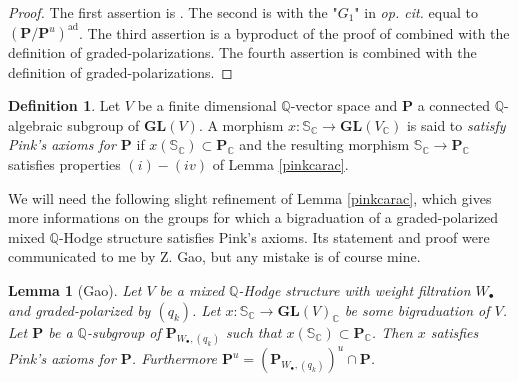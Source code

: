 \documentclass[10pt]{article}
\numberwithin{equation}{subsection}
\theoremstyle{plain}
\newtheorem{lemma}[theorem]{Lemma}
\theoremstyle{definition}
\newtheorem{definition}[theorem]{Definition}
\theoremstyle{remark}
\newcommand{\Q}{\mathbb Q}
\newcommand{\C}{\mathbb C}
\newcommand{\s}{\mathbb S}
\newcommand{\pp}{\mathbf P}
\newcommand{\bul}{\bullet}
\newcommand{\gl}{\mathbf{GL}}
\newcommand{\ad}{\mathrm{ad}}
\newcommand{\ppol}{\pp_{W_\bul, (q_k)}}
\begin{document}
\begin{proof}
The first assertion is \cite[(1.5)]{pinkthese}. The second is \cite[(1.12)]{pinkthese} with the "$G_1$" in \textit{op. cit.} equal to $(\pp/\pp^u)^\ad$. The third assertion is a byproduct of the proof of \cite[(1.5)]{pinkthese} combined with the definition of graded-polarizations. The fourth assertion is \cite[(1.4)(b)]{pinkthese} combined with the definition of graded-polarizations.
\end{proof}
\begin{definition}
Let $V$ be a finite dimensional $\Q$-vector space and $\pp$ a connected $\Q$-algebraic subgroup of $\gl(V)$. A morphism $x : \s_\C \rightarrow \gl(V_\C)$ is said to \textit{satisfy Pink's axioms for $\pp$} if $x(\s_\C) \subset \pp_\C$ and the resulting morphism $\s_\C \rightarrow \pp_\C$ satisfies properties $(i)-(iv)$ of Lemma \ref{pinkcarac}.
\end{definition}
We will need the following slight refinement of Lemma \ref{pinkcarac}, which gives more informations on the groups for which a bigraduation of a graded-polarized mixed $\Q$-Hodge structure satisfies Pink's axioms. Its statement and proof were communicated to me by Z. Gao, but any mistake is of course mine.
\begin{lemma}[Gao]\label{subgroup}
Let $V$ be a mixed $\Q$-Hodge structure with weight filtration $W_\bul$ and graded-polarized by $(q_k)$. Let $x : \s_\C \rightarrow \gl(V)_\C$ be some bigraduation of $V$. Let $\pp$ be a $\Q$-subgroup of $\ppol$ such that $x(\s_\C) \subset \pp_\C$. Then $x$ satisfies Pink's axioms for $\pp$. Furthermore $\pp^u = (\ppol)^u \cap \pp$.
\end{lemma}
\end{document}
